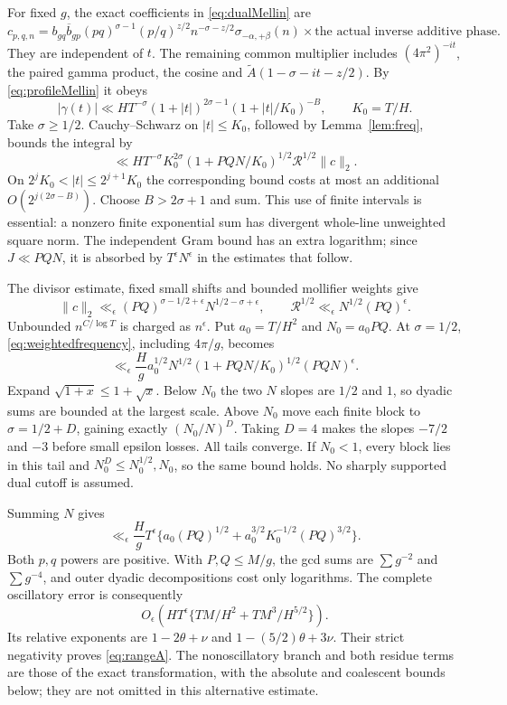 \documentclass[11pt]{article}
\theoremstyle{remark}
\begin{document}
For fixed $g$, the exact coefficients in \eqref{eq:dualMellin} are
\[
 c_{p,q,n}=b_{gq}\overline b_{gp}(pq)^{\sigma-1}
 (p/q)^{z/2}n^{-\sigma-z/2}\sigma_{-\alpha,+\beta}(n)
 \times\text{the actual inverse additive phase}.
\]
They are independent of $t$. The remaining common multiplier includes
$(4\pi^2)^{-it}$, the paired gamma product, the cosine and
$\widetilde A(1-\sigma-it-z/2)$. By \eqref{eq:profileMellin} it obeys
\[
 |\gamma(t)|\ll H T^{-\sigma}(1+|t|)^{2\sigma-1}
                 (1+|t|/K_0)^{-B},\qquad K_0=T/H.
\]
Take $\sigma\ge1/2$. Cauchy--Schwarz on $|t|\le K_0$, followed by
Lemma~\ref{lem:freq}, bounds the integral by
\begin{equation}\label{eq:weightedfrequency}
 \ll H T^{-\sigma}K_0^{2\sigma}
       (1+PQN/K_0)^{1/2}\mathcal R^{1/2}\|c\|_2.
\end{equation}
On $2^jK_0<|t|\le2^{j+1}K_0$ the corresponding bound costs at most
an additional $O(2^{j(2\sigma-B)})$. Choose $B>2\sigma+1$ and sum.
This use of finite intervals is essential: a nonzero finite exponential
sum has divergent whole-line unweighted square norm. The independent
Gram bound has an extra logarithm; since $J\ll PQN$, it is absorbed by
$T^\epsilon N^\epsilon$ in the estimates that follow.

The divisor estimate, fixed small shifts and bounded mollifier weights give
\[
 \|c\|_2\ll_\epsilon(PQ)^{\sigma-1/2+\epsilon}
                         N^{1/2-\sigma+\epsilon},\qquad
 \mathcal R^{1/2}\ll_\epsilon N^{1/2}(PQ)^\epsilon.
\]
Unbounded $n^{C/\log T}$ is charged as $n^\epsilon$. Put
$a_0=T/H^2$ and $N_0=a_0PQ$. At $\sigma=1/2$,
\eqref{eq:weightedfrequency}, including $4\pi/g$, becomes
\[
 \ll_\epsilon \frac Hg a_0^{1/2}N^{1/2}
              (1+PQN/K_0)^{1/2}(PQ N)^\epsilon.
\]
Expand $\sqrt{1+x}\le1+\sqrt x$. Below $N_0$ the two $N$ slopes
are $1/2$ and $1$, so dyadic sums are bounded at the largest scale.
Above $N_0$ move each finite block to $\sigma=1/2+D$, gaining exactly
$(N_0/N)^D$. Taking $D=4$ makes the slopes $-7/2$ and $-3$ before
small epsilon losses. All tails converge. If $N_0<1$, every block lies
in this tail and $N_0^D\le N_0^{1/2},N_0$, so the same bound holds.
No sharply supported dual cutoff is assumed.

Summing $N$ gives
\[
 \ll_\epsilon\frac Hg T^\epsilon
 \{a_0(PQ)^{1/2}+a_0^{3/2}K_0^{-1/2}(PQ)^{3/2}\}.
\]
Both $p,q$ powers are positive. With $P,Q\le M/g$, the gcd sums are
$\sum g^{-2}$ and $\sum g^{-4}$, and outer dyadic decompositions cost
only logarithms. The complete oscillatory error is consequently
\begin{equation}\label{eq:frequencyerror}
 O_\epsilon\left(HT^\epsilon
     \{TM/H^2+TM^3/H^{5/2}\}\right).
\end{equation}
Its relative exponents are $1-2\theta+\nu$ and
$1-(5/2)\theta+3\nu$. Their strict negativity proves
\eqref{eq:rangeA}. The nonoscillatory branch and both residue terms
are those of the exact transformation, with the absolute and coalescent
bounds below; they are not omitted in this alternative estimate.
\end{document}
